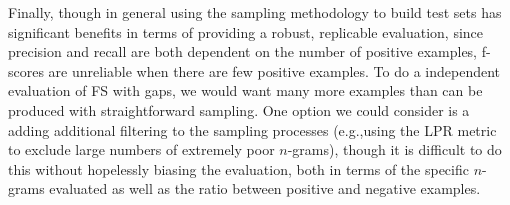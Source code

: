 \documentclass[11pt]{article}
\makeatletter
\def \eg {e.g.,\@ }
\makeatother
\begin{document}
Finally, though in general using the sampling methodology to build test sets has significant benefits in terms of providing a robust, replicable evaluation, since precision and recall are both dependent on the number of positive examples, f-scores are unreliable when there are few positive examples. To do a independent evaluation of FS with gaps, we would want many more examples than can be produced with straightforward sampling. One option we could consider is a adding additional filtering to the sampling processes (\eg using the LPR metric to exclude large numbers of extremely poor $n$-grams), though it is difficult to do this without hopelessly biasing the evaluation, both in terms of the specific $n$-grams evaluated as well as the ratio between positive and negative examples. 












\end{document}
